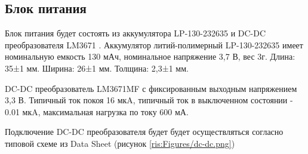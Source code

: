 \begin{sloppypar}
\subsection{Блок питания}

Блок питания будет состоять из аккумулятора LP-130-232635 \cite {li-pol} и DC-DC преобразователя LM3671 \cite {dc-dc}.
Аккумулятор литий-полимерный LP-130-232635 имеет номинальную емкость 130 мАч, номинальное напряжение 3,7 В, вес 3г. Длина: 35±1 мм. Ширина: 26±1 мм. Толщина: 2,3±1 мм. 



DC-DC преобразователь LM3671MF с фиксированным выходным напряжением 3,3 В. Типичный ток покоя 16 мкA, типичный ток в выключенном состоянии - 0.01 мкA, максимальная нагрузка по току 600 мА.

Подключение DC-DC преобразователя будет будет осуществляться согласно типовой схеме из Data Sheet \cite {dc-dc} (рисунок \ref{ris:Figures/dc-dc.png})











\end{sloppypar}
